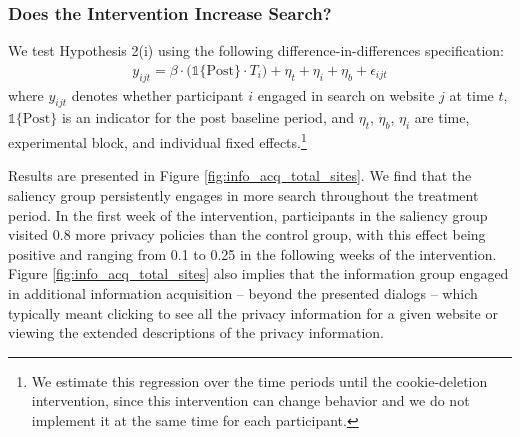 \documentclass[12pt]{article}
\theoremstyle{definition}
\theoremstyle{remark}
\begin{document}
\subsubsection*{Does the Intervention Increase Search?}

We test Hypothesis 2(i) using the following difference-in-differences specification:
\begin{align}\label{eq:did_search}
        y_{ijt} = \beta \cdot \Big (\mathbb{1}\lbrace\text{Post}\rbrace \cdot T_i \Big )+ \eta_t + \eta_i + \eta_{b} + \epsilon_{ijt}
\end{align}
where $y_{ijt}$ denotes whether participant $i$ engaged in search on website $j$ at time $t$, $\mathbb{1}\lbrace\text{Post}\rbrace$ is an indicator for the post baseline period, and $\eta_t$, $\eta_b$, $\eta_i$ are time, experimental block, and individual fixed effects.\footnote{We estimate this regression over the time periods until the cookie-deletion intervention, since this intervention can change behavior and we do not implement it at the same time for each participant.}

Results are presented in Figure \ref{fig:info_acq_total_sites}. We find that the saliency group persistently engages in more search throughout the treatment period. In the first week of the intervention, participants in the saliency group visited 0.8 more privacy policies than the control group, with this effect being positive and ranging from 0.1 to 0.25 in the following weeks of the intervention. Figure \ref{fig:info_acq_total_sites} also implies that the information group engaged in additional information acquisition -- beyond the presented dialogs -- which typically meant clicking to see all the privacy information for a given website or viewing the extended descriptions of the privacy information.
\end{document}
